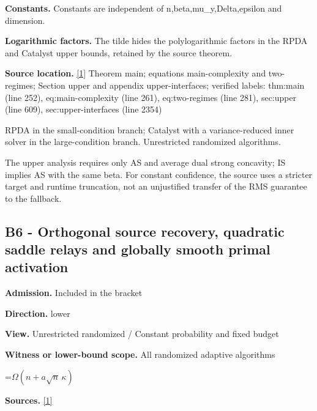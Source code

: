 \documentclass[10pt,a4paper]{article}
\newcommand{\AtlasMath}[1]{\par\begingroup\centering\setbox0=\hbox{$\displaystyle #1$}\ifdim\wd0>1.4\linewidth\typeout{ATLAS WIDE FORMULA: \the\wd0}\fi\ifdim\wd0>\linewidth\resizebox{\linewidth}{!}{\box0}\else\box0\fi\par\endgroup}
\begin{document}
\textbf{Constants.} Constants are independent of n,beta,mu\_y,Delta,epsilon and dimension.



\textbf{Logarithmic factors.} The tilde hides the polylogarithmic factors in the RPDA and Catalyst upper bounds, retained by the source theorem.



\textbf{Source location.} \href{https://github.com/WU-Wendao/Colombo/blob/main/colombo_sensorium/Complexity_altas/data/sources/colombo/U06/manuscript.pdf}{[1]} Theorem main; equations main-complexity and two-regimes; Section upper and appendix upper-interfaces; verified labels: thm:main (line 252), eq:main-complexity (line 261), eq:two-regimes (line 281), sec:upper (line 609), sec:upper-interfaces (line 2354)



RPDA in the small-condition branch; Catalyst with a variance-reduced inner solver in the large-condition branch. Unrestricted randomized algorithms.



The upper analysis requires only AS and average dual strong concavity; IS implies AS with the same beta. For constant confidence, the source uses a stricter target and runtime truncation, not an unjustified transfer of the RMS guarantee to the fallback.



\subsection{B6 - Orthogonal source recovery, quadratic saddle relays and globally smooth primal activation}


\textbf{Admission.} Included in the bracket



\textbf{Direction.} lower



\textbf{View.} Unrestricted randomized / Constant probability and fixed budget



\textbf{Witness or lower-bound scope.} All randomized adaptive algorithms



\AtlasMath{\Omega(n+a\sqrt n\,\kappa)}


\textbf{Sources.} \href{https://github.com/WU-Wendao/Colombo/blob/main/colombo_sensorium/Complexity_altas/data/sources/colombo/U06/manuscript.pdf}{[1]}
\end{document}
